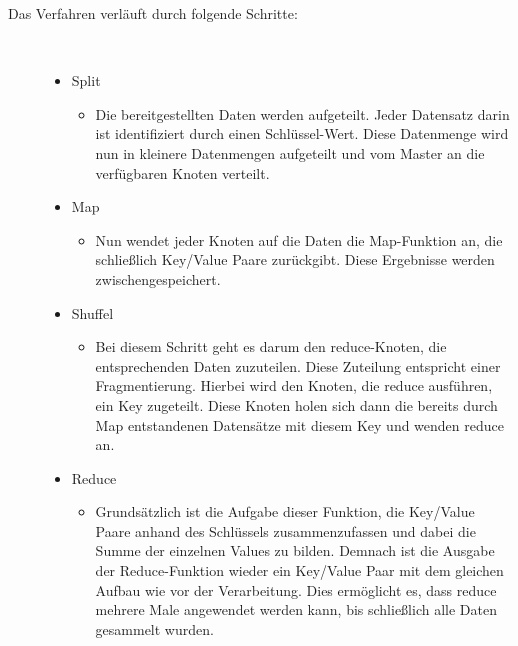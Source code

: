 \documentclass[a4paper,12pt]{article}
\begin{document}
\begin{description}
    \item[Das Verfahren verläuft durch folgende Schritte:] ~\par
    \begin{itemize}
        \item Split
        \begin{itemize}
            \item{Die bereitgestellten Daten werden aufgeteilt. Jeder Datensatz darin ist identifiziert durch
            einen Schlüssel-Wert. Diese Datenmenge wird nun in kleinere Datenmengen aufgeteilt
            und vom Master an die verfügbaren Knoten verteilt.}
        \end{itemize}
        \item Map 
        \begin{itemize}
            \item{Nun wendet jeder Knoten auf die Daten die Map-Funktion an, die schließlich Key/Value Paare zurückgibt. Diese Ergebnisse werden zwischengespeichert.}
        \end{itemize}
        \item Shuffel
        \begin{itemize}
            \item{Bei diesem Schritt geht es darum den reduce-Knoten, die entsprechenden Daten zuzuteilen.
            Diese Zuteilung entspricht einer Fragmentierung.
            Hierbei wird den Knoten, die reduce ausführen, ein Key zugeteilt. Diese Knoten holen sich
            dann die bereits durch Map entstandenen Datensätze mit diesem Key und wenden reduce an.}
        \end{itemize}
        \item Reduce
        \begin{itemize}
            \item{Grundsätzlich ist die Aufgabe dieser Funktion, die Key/Value Paare anhand des Schlüssels
            zusammenzufassen und dabei die Summe der einzelnen Values zu bilden. Demnach ist die
            Ausgabe der Reduce-Funktion wieder ein Key/Value Paar mit dem gleichen Aufbau wie vor
            der Verarbeitung.
            Dies ermöglicht es, dass reduce mehrere Male angewendet werden kann, bis schließlich alle
            Daten gesammelt wurden.}
        \end{itemize}
    \end{itemize} 
\end{description}
\end{document}
